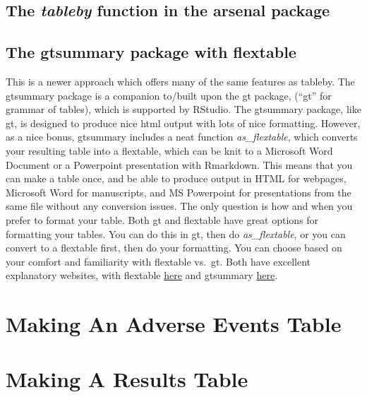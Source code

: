 \documentclass[
]{book}
\begin{document}
\hypertarget{the-tableby-function-in-the-arsenal-package}{%
\subsection{\texorpdfstring{The \emph{tableby} function in the \textbf{arsenal} package}{The tableby function in the arsenal package}}\label{the-tableby-function-in-the-arsenal-package}}

\hypertarget{the-gtsummary-package-with-flextable}{%
\subsection{The gtsummary package with flextable}\label{the-gtsummary-package-with-flextable}}

This is a newer approach which offers many of the same features as tableby. The gtsummary package is a companion to/built upon the gt package, (``gt'' for grammar of tables), which is supported by RStudio. The gtsummary package, like gt, is designed to produce nice html output with lots of nice formatting.
However, as a nice bonus, gtsummary includes a neat function \emph{as\_flextable}, which converts your resulting table into a flextable, which can be knit to a Microsoft Word Document or a Powerpoint presentation with Rmarkdown.
This means that you can make a table once, and be able to produce output in HTML for webpages, Microsoft Word for manuscripts, and MS Powerpoint for presentations from the same file without any conversion issues.
The only question is how and when you prefer to format your table. Both gt and flextable have great options for formatting your tables. You can do this in gt, then do \emph{as\_flextable}, or you can convert to a flextable first, then do your formatting. You can choose based on your comfort and familiarity with flextable vs.~gt. Both have excellent explanatory websites, with flextable \href{https://davidgohel.github.io/flextable/index.html}{here} and gtsummary \href{http://www.danieldsjoberg.com/gtsummary/index.html}{here}.

\hypertarget{making-an-adverse-events-table}{%
\section{Making An Adverse Events Table}\label{making-an-adverse-events-table}}

\hypertarget{making-a-results-table}{%
\section{Making A Results Table}\label{making-a-results-table}}
\end{document}
